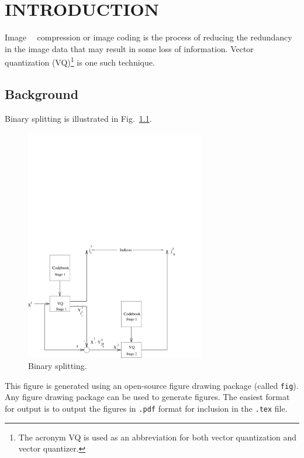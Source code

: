 %
%
%
%

\chapter{INTRODUCTION}\label{ch:introduction}
\thispagestyle{empty}

Image~\cite{TEST}~\cite{TEST2} compression or image coding is the process of reducing the
redundancy in the image data that may result in some loss of
information.  Vector quantization (VQ)\footnote{The acronym VQ is used
  as an abbreviation for both vector quantization and vector
  quantizer.} is one such technique.

\section{Background}\label{sec:background}
Binary splitting is illustrated in Fig.~\ref{fig:split}.

\begin{figure}[htbp]
\centering
\includegraphics[width=0.7\textwidth]{figures/samplefig}
\caption{Binary splitting.}
\label{fig:split}
\end{figure}
This figure is generated using an open-source figure drawing package
(called {\tt fig}).  Any figure drawing package can be used to
generate figures.  The easiest format for output is to output the
figures in {\tt .pdf} format for inclusion in the {\tt .tex} file.

